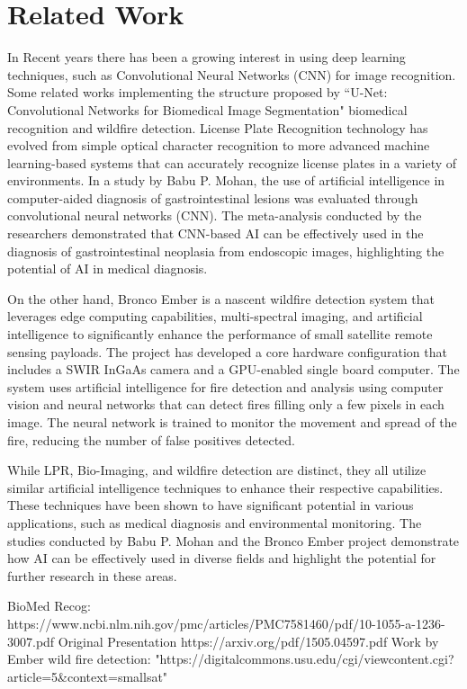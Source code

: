 \documentclass[conference]{IEEEtran}
\begin{document}
\section{Related Work}
\par 
In Recent years there has been a growing interest in using deep learning techniques, such as Convolutional Neural Networks (CNN) for image recognition. Some related works implementing the structure proposed by “U-Net: Convolutional Networks for Biomedical Image Segmentation" biomedical recognition and wildfire detection. License Plate Recognition technology has evolved from simple optical character recognition to more advanced machine learning-based systems that can accurately recognize license plates in a variety of environments. In a study by Babu P. Mohan, the use of artificial intelligence in computer-aided diagnosis of gastrointestinal lesions was evaluated through convolutional neural networks (CNN). The meta-analysis conducted by the researchers demonstrated that CNN-based AI can be effectively used in the diagnosis of gastrointestinal neoplasia from endoscopic images, highlighting the potential of AI in medical diagnosis.
\par 
On the other hand, Bronco Ember is a nascent wildfire detection system that leverages edge computing capabilities, multi-spectral imaging, and artificial intelligence to significantly enhance the performance of small satellite remote sensing payloads. The project has developed a core hardware configuration that includes a SWIR InGaAs camera and a GPU-enabled single board computer. The system uses artificial intelligence for fire detection and analysis using computer vision and neural networks that can detect fires filling only a few pixels in each image. The neural network is trained to monitor the movement and spread of the fire, reducing the number of false positives detected.
\par
While LPR, Bio-Imaging, and wildfire detection are distinct, they all utilize similar artificial intelligence techniques to enhance their respective capabilities. These techniques have been shown to have significant potential in various applications, such as medical diagnosis and environmental monitoring. The studies conducted by Babu P. Mohan and the Bronco Ember project demonstrate how AI can be effectively used in diverse fields and highlight the potential for further research in these areas.
\par
BioMed Recog:
https://www.ncbi.nlm.nih.gov/pmc/articles\linebreak[0]/PMC7581460/pdf/10-1055-a-1236-3007.pdf
Original Presentation
https://arxiv.org/pdf/1505.04597.pdf
Work by Ember wild fire detection:
"https://digitalcommons.usu.edu/cgi/viewcontent.cgi?article=5\&context=smallsat"
\end{document}
